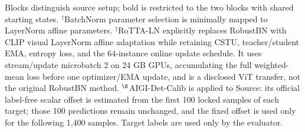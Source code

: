 \begin{table}[t]
\parbox{\textwidth}{\footnotesize Blocks distinguish source setup; bold is restricted to the two blocks with shared starting states. $^{\dagger}$BatchNorm parameter selection is minimally mapped to LayerNorm affine parameters. $^{\ddagger}$RoTTA-LN explicitly replaces RobustBN with CLIP visual LayerNorm affine adaptation while retaining CSTU, teacher/student EMA, entropy loss, and the 64-instance online update schedule. It uses stream/update microbatch 2 on 24 GB GPUs, accumulating the full weighted-mean loss before one optimizer/EMA update, and is a disclosed ViT transfer, not the original RobustBN method. $^{\S}$AIGI-Det-Calib is applied to Source: its official label-free scalar offset is estimated from the first 100 locked samples of each target; those 100 predictions remain unchanged, and the fixed offset is used only for the following 1,400 samples. Target labels are used only by the evaluator.}
\end{table}
